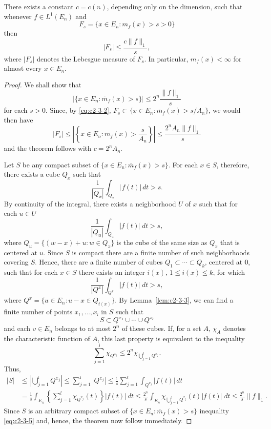 \begin{theorem}\label{thm:c2-3-4}
There exists a constant $c = c(n)$, depending only on the dimension, such that whenever $f \in L^1(E_n)$ and
\[
F_s = \{x \in E_n : m_f(x) > s > 0\}
\]
then
\[
|F_s| \leq \frac{c\|f\|_1}{s},
\]
where $|F_s|$ denotes the Lebesgue measure of $F_s$. In particular, $m_f(x) < \infty$ for almost every $x \in E_n$.
\end{theorem}

\begin{proof}
We shall show that
\begin{equation}\label{eq:c2-3-5}
\left|\{x \in E_n : \overline{m}_f(x) > s\}\right| \leq 2^n \frac{\|f\|_1}{s}
\end{equation}
for each $s > 0$. Since, by \eqref{eq:c2-3-2}, $F_s \subset \{x \in E_n : \overline{m}_f(x) > s/A_n\}$, we would then have
\[
|F_s| \leq \left|\left\{x \in E_n : \overline{m}_f(x) > \frac{s}{A_n}\right\}\right| \leq \frac{2^n A_n \|f\|_1}{s}
\]
and the theorem follows with $c = 2^n A_n$.

Let $S$ be any compact subset of $\{x \in E_n : \overline{m}_f(x) > s\}$. For each $x \in S$, therefore, there exists a cube $Q_x$ such that
\[
\frac{1}{|Q_x|} \int_{Q_x} |f(t)|\,dt > s.
\]
By continuity of the integral, there exists a neighborhood $U$ of $x$ such that for each $u \in U$
\[
\frac{1}{|Q_u|} \int_{Q_u} |f(t)|\,dt > s,
\]
where $Q_u = \{(w - x) + u : w \in Q_x\}$ is the cube of the same size as $Q_x$ that is centered at $u$. Since $S$ is compact there are a finite number of such neighborhoods covering $S$. Hence, there are a finite number of cubes $Q_1 \subset \cdots \subset Q_k$, centered at $0$, such that for each $x \in S$ there exists an integer $i(x)$, $1 \leq i(x) \leq k$, for which
\[
\frac{1}{|Q^x|} \int_{Q^x} |f(t)|\,dt > s,
\]
where $Q^x = \{u \in E_n : u - x \in Q_{i(x)}\}$. By Lemma~\ref{lem:c2-3-3}, we can find a finite number of points $x_1, \dots, x_l$ in $S$ such that
\[
S \subset Q^{x_1} \cup \cdots \cup Q^{x_l}
\]
and each $v \in E_n$ belongs to at most $2^n$ of these cubes. If, for a set $A$, $\chi_A$ denotes the characteristic function of $A$, this last property is equivalent to the inequality
\[
\sum_{j=1}^l \chi_{Q^{x_j}} \leq 2^n \chi_{\bigcup_{j=1}^l Q^{x_j}}.
\]
Thus,
\[
\begin{aligned}
|S| &\leq \left|\bigcup_{j=1}^l Q^{x_j}\right| \leq \sum_{j=1}^l |Q^{x_j}| \leq \frac{1}{s} \sum_{j=1}^l \int_{Q^{x_j}} |f(t)|\,dt \\
&= \frac{1}{s} \int_{E_n} \left\{\sum_{j=1}^l \chi_{Q^{x_j}}(t)\right\} |f(t)|\,dt \leq \frac{2^n}{s} \int_{E_n} \chi_{\bigcup_{j=1}^l Q^{x_j}}(t) |f(t)|\,dt \leq \frac{2^n}{s} \|f\|_1.
\end{aligned}
\]
Since $S$ is an arbitrary compact subset of $\{x \in E_n : \overline{m}_f(x) > s\}$ inequality \eqref{eq:c2-3-5} and, hence, the theorem now follow immediately.
\end{proof}

